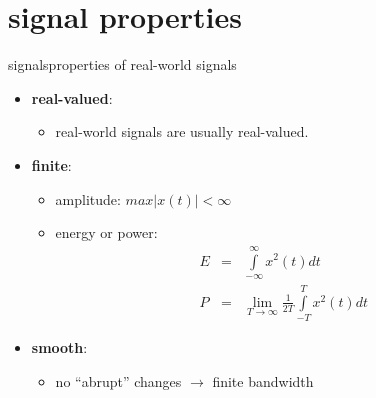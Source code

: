     \section[properties]{signal properties}
        \begin{frame}{signals}{properties of real-world signals}
            \begin{itemize}
                \item   \textbf{real-valued}:
                    \begin{itemize}
                        \item   real-world signals are usually real-valued.
                    \end{itemize}
                \item<2->   \textbf{finite}:
                    \begin{itemize}
                        \item   amplitude: $max|x(t)|<\infty$ 
                        \item<3->   energy or power:
                            \begin{eqnarray*}
                                E &=& \int\limits_{-\infty}^{\infty}{x^2(t) dt}\\
                                P &=& \lim_{T \rightarrow \infty}\frac{1}{2T}\int\limits_{-T}^{T}{x^2(t) dt}
                            \end{eqnarray*}
                    \end{itemize}
                \item<4->   \textbf{smooth}:
                    \begin{itemize}
                        \item  no ``abrupt'' changes $\rightarrow$ finite bandwidth 
                    \end{itemize}
            \end{itemize}
        \end{frame}
